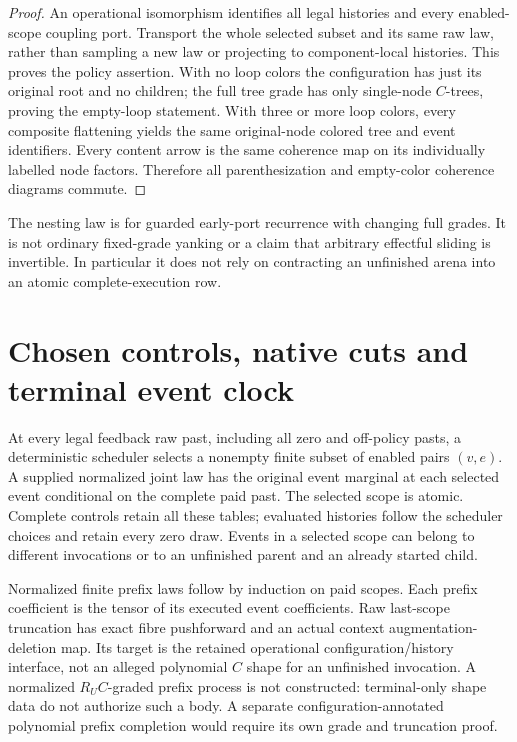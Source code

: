 \documentclass[11pt]{article}
\begin{document}
\begin{proof}
An operational isomorphism identifies all legal histories and every enabled-scope coupling port. Transport the whole selected subset and its same raw law, rather than sampling a new law or projecting to component-local histories. This proves the policy assertion. With no loop colors the configuration has just its original root and no children; the full tree grade has only single-node $C$-trees, proving the empty-loop statement. With three or more loop colors, every composite flattening yields the same original-node colored tree and event identifiers. Every content arrow is the same coherence map on its individually labelled node factors. Therefore all parenthesization and empty-color coherence diagrams commute.
\end{proof}

The nesting law is for guarded early-port recurrence with changing full grades. It is not ordinary fixed-grade yanking or a claim that arbitrary effectful sliding is invertible. In particular it does not rely on contracting an unfinished arena into an atomic complete-execution row.

\section{Chosen controls, native cuts and terminal event clock}
At every legal feedback raw past, including all zero and off-policy pasts, a deterministic scheduler selects a nonempty finite subset of enabled pairs $(v,e)$. A supplied normalized joint law has the original event marginal at each selected event conditional on the complete paid past. The selected scope is atomic. Complete controls retain all these tables; evaluated histories follow the scheduler choices and retain every zero draw. Events in a selected scope can belong to different invocations or to an unfinished parent and an already started child.

Normalized finite prefix laws follow by induction on paid scopes. Each prefix coefficient is the tensor of its executed event coefficients. Raw last-scope truncation has exact fibre pushforward and an actual context augmentation-deletion map. Its target is the retained operational configuration/history interface, not an alleged polynomial $C$ shape for an unfinished invocation. A normalized $R_UC$-graded prefix process is not constructed: terminal-only shape data do not authorize such a body. A separate configuration-annotated polynomial prefix completion would require its own grade and truncation proof.
\end{document}
